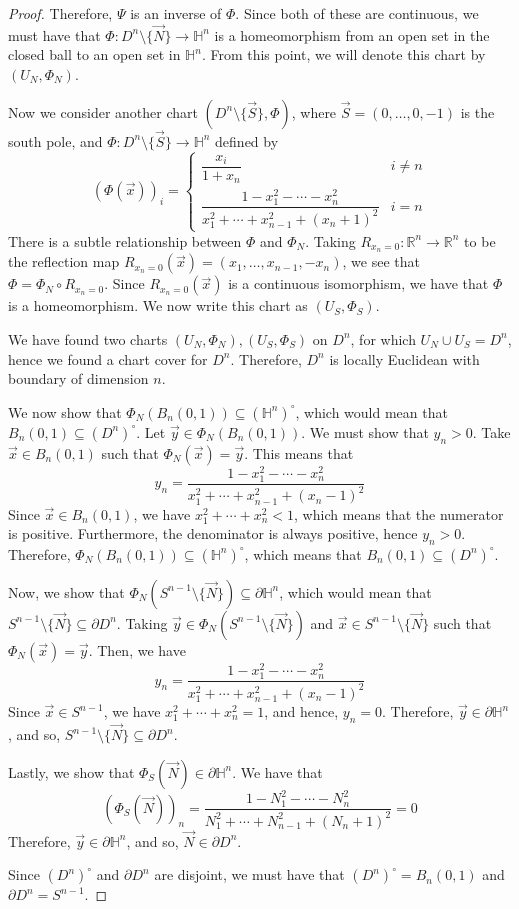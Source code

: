\documentclass{article}
\newcommand{\R}{\mathbb{R}}
\renewcommand{\H}{\mathbb{H}}
\newcommand{\bdr}{\partial}
\theoremstyle{plain} %
\numberwithin{thm}{section} %
\theoremstyle{definition} %
\begin{document}
\begin{proof}
Therefore, $\Psi$ is an inverse of $\Phi$. Since both of these are continuous, we must have that $\Phi: D^n \setminus \{\vec{N}\} \to \H^n$ is a homeomorphism from an open set in the closed ball to an open set in $\H^n$. From this point, we will denote this chart by $(U_N, \Phi_N)$.

Now we consider another chart $(D^n \setminus \{\vec{S}\}, \Phi)$, where $\vec{S} = (0, \dots, 0, -1)$ is the south pole, and $\Phi: D^n \setminus \{\vec{S}\} \to \H^n$ defined by
\[
    (\Phi(\vec{x}))_i = \begin{cases}
        \dfrac{x_i}{1 + x_n} & i \neq n \\
        \dfrac{1 - x_1^2 - \cdots - x_n^2}{x_1^2 + \cdots + x_{n - 1}^2 + (x_n + 1)^2} & i = n
    \end{cases}
\]
There is a subtle relationship between $\Phi$ and $\Phi_N$. Taking $R_{x_n = 0}: \R^n \to \R^n$ to be the reflection map $R_{x_n = 0}(\vec{x}) = (x_1, \dots, x_{n - 1}, -x_n)$, we see that $\Phi = \Phi_N \circ R_{x_n = 0}$. Since $R_{x_n = 0}(\vec{x})$ is a continuous isomorphism, we have that $\Phi$ is a homeomorphism. We now write this chart as $(U_S, \Phi_S)$.

We have found two charts $(U_N, \Phi_N), (U_S, \Phi_S)$ on $D^n$, for which $U_N \cup U_S = D^n$, hence we found a chart cover for $D^n$. Therefore, $D^n$ is locally Euclidean with boundary of dimension $n$.

We now show that $\Phi_N(B_n(0, 1)) \subseteq (\H^n)^\circ$, which would mean that $B_n(0, 1) \subseteq (D^n)^\circ$. Let $\vec{y} \in \Phi_N(B_n(0, 1))$. We must show that $y_n > 0$. Take $\vec{x} \in B_n(0, 1)$ such that $\Phi_N(\vec{x}) = \vec{y}$. This means that
\[
    y_n = \dfrac{1 - x_1^2 - \cdots - x_n^2}{x_1^2 + \cdots + x_{n - 1}^2 + (x_n - 1)^2}
\]
Since $\vec{x} \in B_n(0, 1)$, we have $x_1^2 + \cdots + x_n^2 < 1$, which means that the numerator is positive. Furthermore, the denominator is always positive, hence $y_n > 0$. Therefore, $\Phi_N(B_n(0, 1)) \subseteq (\H^n)^\circ$, which means that $B_n(0, 1) \subseteq (D^n)^\circ$.

Now, we show that $\Phi_N(S^{n - 1} \setminus \{\vec{N}\}) \subseteq \bdr\H^n$, which would mean that $S^{n - 1} \setminus \{\vec{N}\} \subseteq \bdr D^n$. Taking $\vec{y} \in \Phi_N(S^{n - 1} \setminus \{\vec{N}\})$ and $\vec{x} \in S^{n - 1} \setminus \{\vec{N}\}$ such that $\Phi_N(\vec{x}) = \vec{y}$. Then, we have
\[
    y_n = \dfrac{1 - x_1^2 - \cdots - x_n^2}{x_1^2 + \cdots + x_{n - 1}^2 + (x_n - 1)^2}
\]
Since $\vec{x} \in S^{n - 1}$, we have $x_1^2 + \cdots + x_n^2 = 1$, and hence, $y_n = 0$. Therefore, $\vec{y} \in \bdr\H^n$, and so, $S^{n - 1} \setminus \{\vec{N}\} \subseteq \bdr D^n$.

Lastly, we show that $\Phi_S(\vec{N}) \in \bdr\H^n$. We have that
\[
    (\Phi_S(\vec{N}))_n = \dfrac{1 - N_1^2 - \cdots - N_n^2}{N_1^2 + \cdots + N_{n - 1}^2 + (N_n + 1)^2} = 0
\]
Therefore, $\vec{y} \in \bdr\H^n$, and so, $\vec{N} \in \bdr D^n$.

Since $(D^n)^\circ$ and $\bdr D^n$ are disjoint, we must have that $(D^n)^\circ = B_n(0, 1)$ and $\bdr D^n = S^{n - 1}$.
\end{proof}
\end{document}
